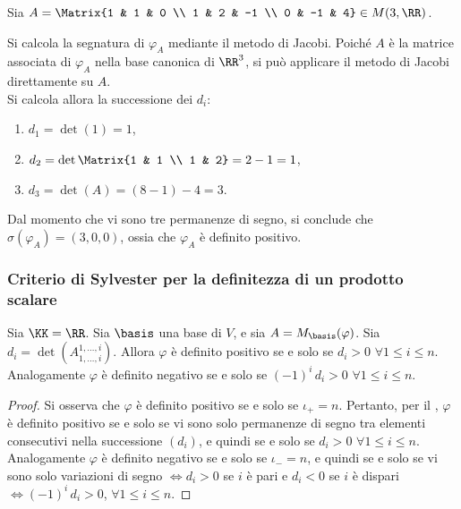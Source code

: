 \begin{example}
	Sia $A = \Matrix{1 & 1 & 0 \\ 1 & 2 & -1 \\ 0 & -1 & 4} \in M(3, \RR)$. \\
	
	\vskip 0.1in
	
	Si calcola la segnatura di $\varphi_A$ mediante
	il metodo di Jacobi. Poiché $A$ è la matrice associata di $\varphi_A$ nella base canonica di $\RR^3$,
	si può applicare il metodo di Jacobi direttamente su $A$. \\
	
	Si calcola allora la successione dei $d_i$:
	
	\begin{enumerate}
		\item $d_1 = \det(1) = 1$,
		\item $d_2 = \det\Matrix{1 & 1 \\ 1 & 2} = 2 - 1 = 1$,
		\item $d_3 = \det(A) = (8 - 1) - 4 = 3$.
	\end{enumerate}
	
	Dal momento che vi sono tre permanenze di segno, si conclude che $\sigma(\varphi_A) = (3, 0, 0)$, ossia
	che $\varphi_A$ è definito positivo.
\end{example}

\subsubsection{Criterio di Sylvester per la definitezza di un prodotto scalare}

\begin{proposition} Sia $\KK= \RR$.
	Sia $\basis$ una base di $V$, e sia $A = M_\basis(\varphi)$. Sia $d_i = \det\left(A^{1,\ldots,i}_{1,\ldots,i}\right)$.
	Allora $\varphi$ è definito positivo se e solo se $d_i > 0$ $\forall 1 \leq i \leq n$. Analogamente
	$\varphi$ è definito negativo se e solo se $(-1)^i \, d_i > 0$ $\forall 1 \leq i \leq n$. 
\end{proposition}

\begin{proof}
	Si osserva che $\varphi$ è definito positivo se e solo se $\iota_+ = n$. Pertanto, per il
	\textit{}, $\varphi$ è definito positivo se e solo se vi sono
	solo permanenze di segno tra elementi consecutivi nella successione $(d_i)$, e quindi
	se e solo se $d_i > 0$ $\forall 1 \leq i \leq n$. Analogamente $\varphi$ è definito
	negativo se e solo se $\iota_- = n$, e quindi se e solo se vi sono solo variazioni
	di segno $\iff d_i > 0$ se $i$ è pari e $d_i < 0$ se $i$ è dispari $\iff (-1)^i \, d_i > 0$, $\forall 1 \leq i \leq n$.
	
\end{proof}